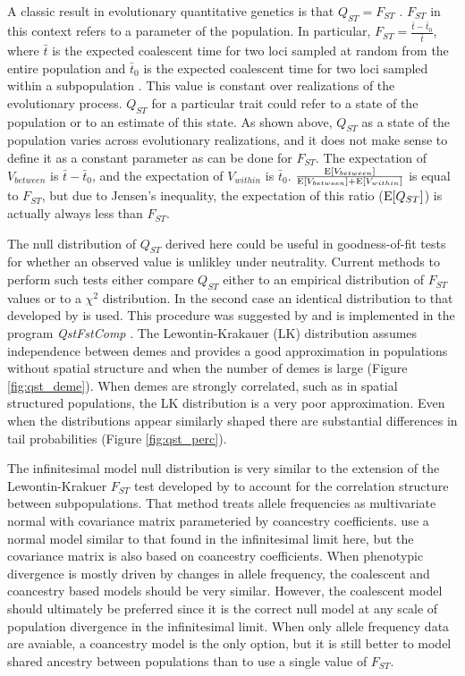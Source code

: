 A classic result in evolutionary quantitative genetics is that $Q_{ST}=F_{ST}$
\citep{Whitlock1999}. $F_{ST}$ in this context refers to a parameter of the
population. In particular, $F_{ST} = \frac{\bar{t} - \bar{t}_0}{\bar{t}}$, where
$\bar{t}$ is the expected coalescent time for two loci sampled at random from
the entire population and $\bar{t}_0$ is the expected coalescent time for two
loci sampled within a subpopulation \citep{Slatkin1991}. This value is constant
over realizations of the evolutionary process. $Q_{ST}$ for a particular trait
could refer to a state of the population or to an estimate of this state. As
shown above, $Q_{ST}$ as a state of the population varies across evolutionary
realizations, and it does not make sense to define it as a constant parameter as
can be done for $F_{ST}$. The expectation of $V_{between}$ is
$\bar{t} - \bar{t}_0$, and the expectation of $V_{within}$ is $\bar{t}_0$.
$\frac{\mathrm{E}[V_{between}]}{\mathrm{E}[V_{between}] + \mathrm{E}[V_{within}]}$ is equal to $F_{ST}$,
but due to Jensen's inequality, the expectation of this ratio ($\mathrm{E}[Q_{ST}]$) is
actually always less than $F_{ST}$.

The null distribution of $Q_{ST}$ derived here could be useful in
goodness-of-fit tests for whether an observed value is unlikley under
neutrality. Current methods to perform such tests either compare $Q_{ST}$ either
to an empirical distribution of $F_{ST}$ values or to a $\chi^2$ distribution.
In the second case an identical distribution to that developed by
\citet{Lewontin1973} is used. This procedure was suggested by
\citet{Whitlock2009} and is implemented in the program \textit{QstFstComp}
\citep{Gilbert2015}. The Lewontin-Krakauer (LK) distribution assumes
independence between demes and provides a good approximation in populations
without spatial structure and when the number of demes is large (Figure
\ref{fig:qst_deme}). When demes are strongly correlated, such as in spatial
structured populations, the LK distribution is a very poor approximation. Even
when the distributions appear similarly shaped there are substantial differences
in tail probabilities (Figure \ref{fig:qst_perc}).

The infinitesimal model null distribution is very similar to the extension of
the Lewontin-Krakuer $F_{ST}$ test developed by \citet{Bonhomme2010} to account
for the correlation structure between subpopulations. That method treats allele
frequencies as multivariate normal with covariance matrix parameteried by
coancestry coefficients. \citet{Ovaskainen2011} use a normal model similar to
that found in the infinitesimal limit here, but the covariance matrix is also
based on coancestry coefficients. When phenotypic divergence is mostly driven by
changes in allele frequency, the coalescent and coancestry based models should
be very similar. However, the coalescent model should ultimately be preferred
since it is the correct null model at any scale of population divergence in the
infinitesimal limit. When only allele frequency data are avaiable, a coancestry
model is the only option, but it is still better to model shared ancestry
between populations than to use a single value of $F_{ST}$.
